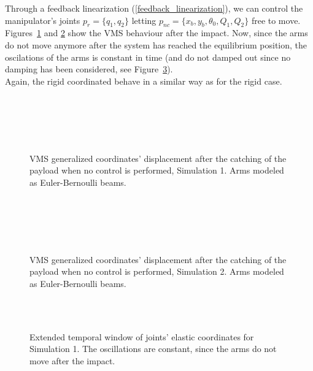 \documentclass[a4paper,12pt,oneside]{report}
\begin{document}
Through a feedback linearization (\ref{feedback_linearization}), we can control the manipulator's joints $p_r=\{q_1,q_2\}$ letting $p_{nc}=\{x_b,y_b,\theta_0,Q_1,Q_2\}$ free to move.\\
Figures~\ref{contolled_elastic_1} and \ref{controlled_elastic_2} show the VMS behaviour after the impact. Now, since the arms do not move anymore after the system has reached the equilibrium position, the oscilations of the arms is constant in time (and do not damped out since no damping has been considered, see Figure~\ref{no_beat}).\\
Again, the rigid coordinated behave in a similar way as for the rigid case.
\begin{figure}[h]
  \centering
  \subfloat{} \quad
  \subfloat{}\\
  \subfloat{}\\
  \subfloat{}\quad
  \subfloat{}\\
  \subfloat{}\quad
  \subfloat{}\\
  \caption{VMS generalized coordinates’ displacement after the catching of the payload
  when no control is performed, Simulation 1. Arms modeled as Euler-Bernoulli beams.}
  \label{contolled_elastic_1}
\end{figure}
\begin{figure}[h]
  \centering
  \subfloat{} \quad
  \subfloat{}\\
  \subfloat{}\\
  \subfloat{}\quad
  \subfloat{}\\
  \subfloat{}\quad
  \subfloat{}\\
  \caption{VMS generalized coordinates’ displacement after the catching of the payload
  when no control is performed, Simulation 2. Arms modeled as Euler-Bernoulli beams.}
  \label{controlled_elastic_2}
\end{figure}
\begin{figure}
  \centering
  \\
  \\
  \caption{Extended temporal window of joints' elastic coordinates for Simulation 1. The oscillations are constant, since the arms do not move after the impact.}
  \label{no_beat}
\end{figure}
\end{document}
